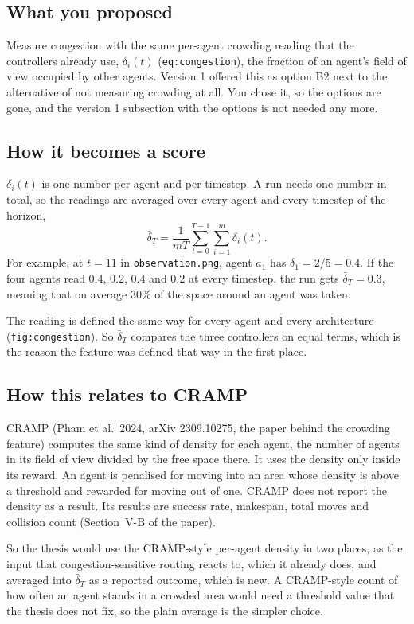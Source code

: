 \documentclass[11pt,a4paper]{article}
\begin{document}
\subsection{What you proposed}

Measure congestion with the same per-agent crowding reading that the
controllers already use, $\delta_i(t)$ (\texttt{eq:congestion}), the
fraction of an agent's field of view occupied by other agents. Version 1
offered this as option B2 next to the alternative of not measuring
crowding at all. You chose it, so the options are gone, and the version 1
subsection with the options is not needed any more.

\subsection{How it becomes a score}

$\delta_i(t)$ is one number per agent and per timestep. A run needs one
number in total, so the readings are averaged over every agent and every
timestep of the horizon,
\[
  \bar\delta_T = \frac{1}{mT}\sum_{t=0}^{T-1}\sum_{i=1}^{m}\delta_i(t) .
\]
For example, at $t = 11$ in \texttt{observation.png}, agent $a_1$ has
$\delta_1 = 2/5 = 0.4$. If the four agents read $0.4$, $0.2$, $0.4$ and
$0.2$ at every timestep, the run gets $\bar\delta_T = 0.3$, meaning that on
average 30\% of the space around an agent was taken.

The reading is defined the same way for every agent and every
architecture (\texttt{fig:congestion}). So $\bar\delta_T$ compares the
three controllers on equal terms, which is the reason the feature was
defined that way in the first place.

\subsection{How this relates to CRAMP}

CRAMP (Pham et al.\ 2024, arXiv 2309.10275, the paper behind the crowding feature) computes the same kind of density for each agent,
the number of agents in its field of view divided by the free space there.
It uses the density only inside its reward. An agent is penalised for
moving into an area whose density is above a threshold and rewarded for
moving out of one. CRAMP does not report the density as a result. Its
results are success rate, makespan, total moves and collision count
(Section~V-B of the paper).

So the thesis would use the CRAMP-style per-agent density in two places,
as the input that congestion-sensitive routing reacts to, which it
already does, and averaged into $\bar\delta_T$ as a reported outcome,
which is new. A CRAMP-style count of how often an agent stands in a
crowded area would need a threshold value that the thesis does not fix,
so the plain average is the simpler choice.
\end{document}
